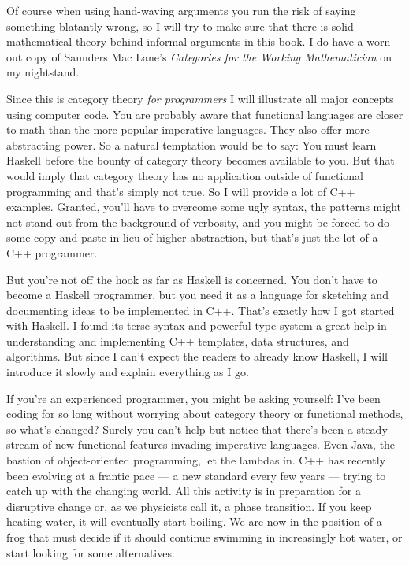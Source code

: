 Of course when using hand-waving arguments you run the risk of saying
something blatantly wrong, so I will try to make sure that there is
solid mathematical theory behind informal arguments in this book. I do
have a worn-out copy of Saunders Mac Lane's \emph{Categories for
  the Working Mathematician} on my nightstand.

Since this is category theory \emph{for programmers} I will illustrate
all major concepts using computer code. You are probably aware that
functional languages are closer to math than the more popular imperative
languages. They also offer more abstracting power. So a natural
temptation would be to say: You must learn Haskell before the bounty of
category theory becomes available to you. But that would imply that
category theory has no application outside of functional programming and
that's simply not true. So I will provide a lot of C++ examples.
Granted, you'll have to overcome some ugly syntax, the patterns might
not stand out from the background of verbosity, and you might be forced
to do some copy and paste in lieu of higher abstraction, but that's just
the lot of a C++ programmer.

But you're not off the hook as far as Haskell is concerned. You don't
have to become a Haskell programmer, but you need it as a language for
sketching and documenting ideas to be implemented in C++. That's exactly
how I got started with Haskell. I found its terse syntax and powerful
type system a great help in understanding and implementing C++
templates, data structures, and algorithms. But since I can't expect the
readers to already know Haskell, I will introduce it slowly and explain
everything as I go.

If you're an experienced programmer, you might be asking yourself: I've
been coding for so long without worrying about category theory or
functional methods, so what's changed? Surely you can't help but notice
that there's been a steady stream of new functional features invading
imperative languages. Even Java, the bastion of object-oriented
programming, let the lambdas in. C++ has recently been evolving at a
frantic pace --- a new standard every few years --- trying to catch up
with the changing world. All this activity is in preparation for a
disruptive change or, as we physicists call it, a phase transition. If
you keep heating water, it will eventually start boiling. We are now in
the position of a frog that must decide if it should continue swimming
in increasingly hot water, or start looking for some alternatives.

